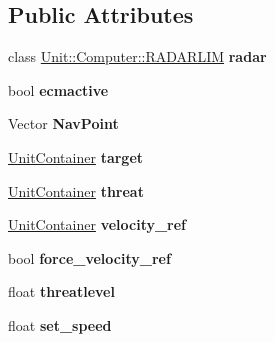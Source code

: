 \subsection*{Public Attributes}
\begin{DoxyCompactItemize}
\item 
class \hyperlink{classUnit_1_1Computer_1_1RADARLIM}{Unit\+::\+Computer\+::\+R\+A\+D\+A\+R\+L\+IM} {\bfseries radar}\hypertarget{classUnit_1_1Computer_a14c11e057e24829d2dd875ee78b1c3cf}{}\label{classUnit_1_1Computer_a14c11e057e24829d2dd875ee78b1c3cf}

\item 
bool {\bfseries ecmactive}\hypertarget{classUnit_1_1Computer_a0ca8bccc784a2a6de65870dc151d9887}{}\label{classUnit_1_1Computer_a0ca8bccc784a2a6de65870dc151d9887}

\item 
Vector {\bfseries Nav\+Point}\hypertarget{classUnit_1_1Computer_acb5221d0f3a5b670cb7c773c267f5d76}{}\label{classUnit_1_1Computer_acb5221d0f3a5b670cb7c773c267f5d76}

\item 
\hyperlink{classUnitContainer}{Unit\+Container} {\bfseries target}\hypertarget{classUnit_1_1Computer_a6583466e6d24ae982f470fe3fa5c34da}{}\label{classUnit_1_1Computer_a6583466e6d24ae982f470fe3fa5c34da}

\item 
\hyperlink{classUnitContainer}{Unit\+Container} {\bfseries threat}\hypertarget{classUnit_1_1Computer_a1eca96e53b63fd426547e456d6399801}{}\label{classUnit_1_1Computer_a1eca96e53b63fd426547e456d6399801}

\item 
\hyperlink{classUnitContainer}{Unit\+Container} {\bfseries velocity\+\_\+ref}\hypertarget{classUnit_1_1Computer_a7829ff257ebb1997413037f437696bc7}{}\label{classUnit_1_1Computer_a7829ff257ebb1997413037f437696bc7}

\item 
bool {\bfseries force\+\_\+velocity\+\_\+ref}\hypertarget{classUnit_1_1Computer_a12836009d88f6c1e4276b52f10374e85}{}\label{classUnit_1_1Computer_a12836009d88f6c1e4276b52f10374e85}

\item 
float {\bfseries threatlevel}\hypertarget{classUnit_1_1Computer_ae223459691e2d160217bf8d90032e924}{}\label{classUnit_1_1Computer_ae223459691e2d160217bf8d90032e924}

\item 
float {\bfseries set\+\_\+speed}\hypertarget{classUnit_1_1Computer_a7a24ee410054c963f1811e312bd1c806}{}\label{classUnit_1_1Computer_a7a24ee410054c963f1811e312bd1c806}


\end{DoxyCompactItemize}
